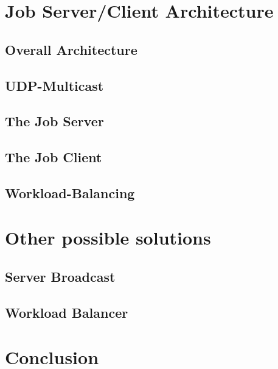 \chapter{Job Server/Client Architecture}
\label{job}
\section{Overall Architecture}
\section{UDP-Multicast}
\section{The Job Server}
\section{The Job Client}
\section{Workload-Balancing}
\chapter{Other possible solutions}
\label{other-solutions}
\section{Server Broadcast}
\section{Workload Balancer}

\chapter{Conclusion}
\label{conclusion}
